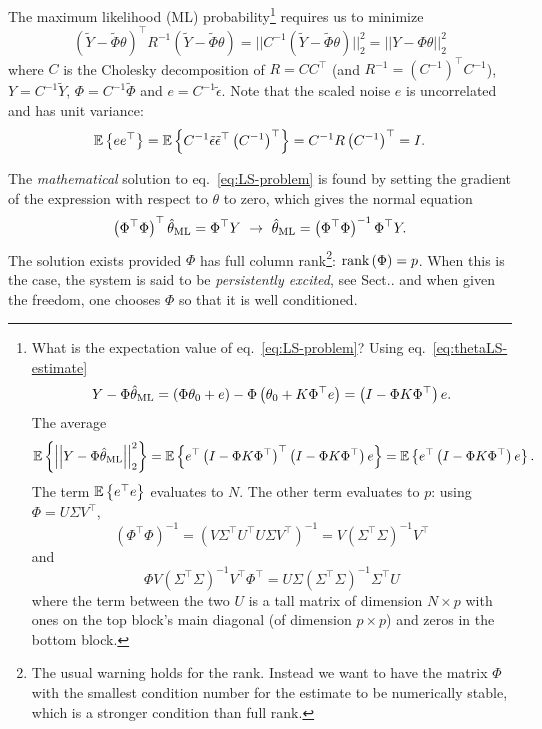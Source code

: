 The maximum likelihood (ML) probability\footnote{What is the expectation value of eq.~\eqref{eq:LS-problem}? Using eq.~\eqref{eq:thetaLS-estimate}
  \begin{equation*}
    Y-\Phi\hat{\theta}_\textrm{ML} = (\Phi\theta_0 + e) - \Phi\left(\theta_0 + K \Phi^\top e\right) = \left(I - \Phi K \Phi^\top\right)e.
  \end{equation*}
  The average
  \begin{equation*}
    \mathbb{E}\left\{\left|\left|Y - \Phi \hat{\theta}_\textrm{ML}\right|\right|_2^2\right\} = \mathbb{E}\left\{e^\top\left(I - \Phi K \Phi^\top\right)^\top\left(I - \Phi K \Phi^\top\right)e\right\} = \mathbb{E}\left\{e^\top\left(I - \Phi K \Phi^\top\right)e\right\}.
  \end{equation*}
  The term $\mathbb{E}\left\{e^\top e\right\}$ evaluates to $N$. The other term evaluates to $p$: using $\Phi = U\Sigma V^\top$,
  \begin{equation*}
    (\Phi^\top \Phi)^{-1} = \left(V\Sigma^\top U^\top U\Sigma V^\top\right)^{-1} = V\left(\Sigma^\top\Sigma\right)^{-1}V^\top
  \end{equation*}
  and
  \begin{equation*}
    \Phi V\left(\Sigma^\top\Sigma\right)^{-1}V^\top \Phi^\top = U\Sigma \left(\Sigma^\top\Sigma\right)^{-1}\Sigma^\top U
  \end{equation*}
where the term between the two $U$ is a tall matrix of dimension $N\times p$ with ones on the top block's main diagonal (of dimension $p\times p$) and zeros in the bottom block.} requires us to minimize
\begin{equation}
  \label{eq:LS-problem}
  (\tilde{Y} - \tilde{\Phi} \theta)^\top R^{-1} (\tilde{Y} - \tilde{\Phi} \theta) = ||C^{-1} (\tilde{Y} - \tilde{\Phi} \theta)||_2^2 = ||Y - \Phi \theta||_2^2
\end{equation}
where $C$ is the Cholesky decomposition of $R = C C^\top$ (and $R^{-1} = \left(C^{-1}\right)^\top C^{-1}$), $Y = C^{-1}\tilde{Y}$, $\Phi = C^{-1}\tilde{\Phi}$ and $e=C^{-1}\tilde{\epsilon}$. Note that the scaled noise $e$ is uncorrelated and has unit variance:
\begin{equation*}
  \mathbb{E}\left\{e e^\top\right\} = \mathbb{E}\left\{C^{-1}\tilde{\epsilon} \tilde{\epsilon}^\top \left(C^{-1}\right)^\top\right\} = C^{-1}R \left(C^{-1}\right)^\top = I.
\end{equation*}

The \emph{mathematical} solution to eq.~\eqref{eq:LS-problem} is found by setting the gradient of the expression with respect to $\theta$ to zero, which gives the normal equation
\begin{equation}
  \label{eq:LS-estimator}
  \left(\Phi^\top\Phi\right)^\top \thetaLS = \Phi^\top Y\ \rightarrow\ \thetaLS = \left(\Phi^\top \Phi\right)^{-1} \Phi^\top Y.
\end{equation}
The solution exists provided $\Phi$ has full column rank\footnote{The usual warning holds for the rank. Instead we want to have the matrix $\Phi$ with the smallest condition number for the estimate to be numerically stable, which is a stronger condition than full rank.}: $\textrm{rank}\left(\Phi\right) = p$. When this is the case, the system is said to be \emph{persistently excited}, see Sect.. and when given the freedom, one chooses $\Phi$ so that it is well conditioned.

